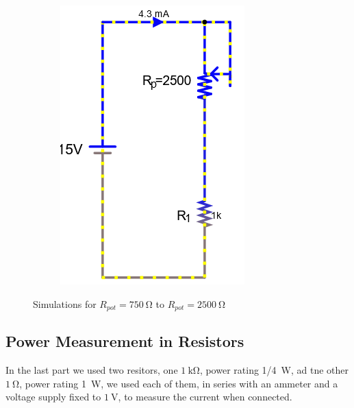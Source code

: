 \documentclass[a4paper]{article}
\begin{document}
\begin{figure}[H]
\begin{subfigure}{0.333\textwidth}
        \includegraphics[width=.9\linewidth]{pot10}
    \end{subfigure}
    \caption{Simulations for $R_{pot}=\SI{750}{\ohm}$ to $R_{pot}=\SI{2500}{\ohm}$}
\end{figure}
\subsection{Power Measurement in Resistors}
In the last part we used two resitors, one $\SI{1}{\kilo\ohm}$, power rating \SI{1/4}{\watt}, ad tne other
$\SI{1}{\ohm}$, power rating \SI{1}{\watt}, we used each of them, in series with an ammeter and a voltage
supply fixed to $\SI{1}{\volt}$, to measure the current when connected.
\end{document}
